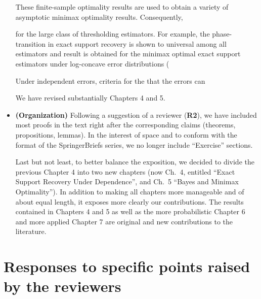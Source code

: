 \documentclass[11pt]{article}
\begin{document}
\begin{itemize}
   
   These finite-sample optimality results are used to obtain a variety of asymptotic minimax optimality results.  Consequently,  
   
    for the large class of
   thresholding estimators. For example, the phase-transition in exact support recovery is shown to  universal among all estimators and  result is obtained for the minimax optimal exact support estimators under 
   log-concave error distributions (
   
   Under independent 
   errors, criteria for the 
   that the errors can 
   
   We have revised substantially Chapters 4 and 5.
   
  
  
  \item {\bf (Organization)} Following a suggestion of a reviewer ({\bf R2}),  we have included most proofs 
  in the text right after the corresponding claims (theorems, propositions, lemmas).  In the interest of space and to conform with the format of
  the SpringerBriefs series, we no longer include ``Exercise'' sections. 
  
  Last but not least, to better balance the exposition, we decided to divide the previous
  Chapter 4 into two new chapters (now Ch.\ 4, entitled ``Exact Support Recovery Under Dependence'', 
  and Ch.\ 5 ``Bayes and Minimax Optimality'').  In addition to making all chapters more manageable and of about equal length, it exposes more
  clearly our contributions.  The results contained in Chapters 4 and 5 as well as the more probabilistic Chapter 6 and more applied Chapter 7 are 
  original and new contributions to the literature.
  
 \end{itemize}
 
 
 \section*{Responses to specific points raised by the reviewers}
\end{document}
